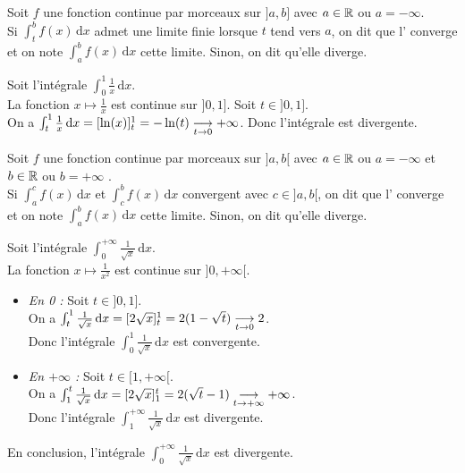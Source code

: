 \documentclass{book}
\begin{document}
\begin{Definition}[Intégrale impropre sur {$]a,b]$}]
Soit $f$ une fonction continue par morceaux  sur $]a,b]$ avec $a \in \mathbb{R}$ ou $a= -\infty$.\\
Si $\int_t^b f(x) \,\mathrm dx$ admet une limite finie lorsque $t$ tend vers $a$, on dit que l' converge et on
note $\int_a^b f(x) \,\mathrm dx$ cette limite. Sinon, on dit qu'elle diverge.
\end{Definition}
\begin{Exemple}
Soit l'intégrale $\int_0^{1} \frac{1}{x}\,\mathrm dx$.\\
La fonction $ x\mapsto  \frac{1}{x}$ est continue sur $]0,1]$.  Soit $t\in ]0,1]$.\\
On a  $\int_t^1 \frac{1}{x}\,\mathrm dx=[\ln (x)]_t^1=-\ln(t)\tend[t\to 0 ]+\infty$. Donc l'intégrale est divergente.
\end{Exemple}
\begin{Definition}
Soit $f$ une fonction continue par morceaux  sur $]a,b[$ avec $a \in \mathbb{R}$ ou $a= -\infty$ et $b \in \mathbb{R}$ ou $b= +\infty$ .\\
Si $\int_a^c f(x) \,\mathrm dx$ et $\int_c^b f(x) \,\mathrm dx$  convergent avec $c\in ]a,b[$, on dit que l' converge et on
note $\int_a^b f(x) \,\mathrm dx$ cette limite. Sinon, on dit qu'elle diverge.
\end{Definition}
\begin{Exemple}
Soit l'intégrale $\int_0^{+\infty } \frac{1}{\sqrt{x}}\,\mathrm dx$.\\
La fonction $ x\mapsto  \frac{1}{x^2}$ est continue sur $]0,+\infty[$. \\
\begin{itemize}
\item \textit{En 0 :}   Soit $t\in ]0,1]$.\\
On a  $\int_t^1 \frac{1}{\sqrt{x}}\,\mathrm dx=[2 \sqrt{x}]_t^1=2(1-\sqrt{t})\tend[t\to 0 ]2$.\\Donc l'intégrale $\int_0^1  \frac{1}{\sqrt{x}}\,\mathrm dx$  est convergente.
\item \textit{En $+\infty$ :} Soit $t\in [1,{+\infty }[$.\\
On a  $\int_1^t \frac{1}{\sqrt{x}}\,\mathrm dx=[2 \sqrt{x}]_1^t=2(\sqrt{t}-1)\tend[t\to +\infty ]+\infty $.\\Donc l'intégrale $\int_1^{+\infty } \frac{1}{\sqrt{x}}\,\mathrm dx$ est divergente.
\end{itemize}
En conclusion,  l'intégrale $\int_0^{+\infty } \frac{1}{\sqrt{x}}\,\mathrm dx$ est divergente.
\end{Exemple}
\end{document}
